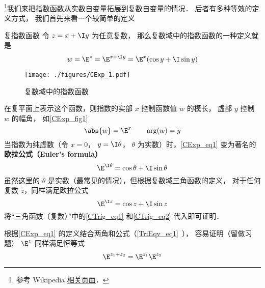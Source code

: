 
\begin{issues}
\issueTODO
\end{issues}



\footnote{参考 Wikipedia \href{https://en.wikipedia.org/wiki/Euler's_formula}{相关页面}．}我们来把指数函数从实数自变量拓展到复数自变量的情况． 后者有多种等效的定义方式， 我们首先来看一个较简单的定义

\begin{definition}{复指数函数}
令 $z = x + \I y$ 为任意复数， 那么复数域中的指数函数的一种定义就是
\begin{equation}\label{CExp_eq1}
w = \E^z = \E^{x + \I y} = \E^x(\cos y + \I\sin y)
\end{equation}
\end{definition}

\begin{figure}[ht]
\centering
\texttt{[image: ./figures/CExp\_1.pdf]}
\caption{复数域中的指数函数} \label{CExp_fig1}
\end{figure}

在复平面上表示这个函数，则指数的实部 $x$ 控制函数值 $w$ 的模长， 虚部 $y$ 控制 $w$ 的幅角， 如\autoref{CExp_fig1}
 \begin{equation}
\abs{w} = \E^x \qquad \arg(w) = y
\end{equation}
当指数为纯虚数（令 $x = 0$， $y = \I\theta$， $\theta$ 为实数）时，\autoref{CExp_eq1} 变为著名的\textbf{欧拉公式（Euler's formula）}
\begin{equation}\label{CExp_eq2}
\E^{\I \theta} = \cos \theta + \I\sin \theta
\end{equation}
虽然这里的 $\theta$ 是实数（最常见的情况），但根据复数域三角函数的定义， 对于任何复数 $z$，同样满足欧拉公式
\begin{equation}
\E^{\I z} = \cos z + \I\sin z
\end{equation}
将“三角函数（复数）”中的\autoref{CTrig_eq1} 和\autoref{CTrig_eq2} 代入即可证明．

根据\autoref{CExp_eq1} 的定义结合两角和公式（\autoref{TriEqv_eq1}~）， 容易证明（留做习题） $\E^z$ 同样满足恒等式
\begin{equation}
\E^{z_1 + z_2} = \E^{z_1}\E^{z_2}
\end{equation}

